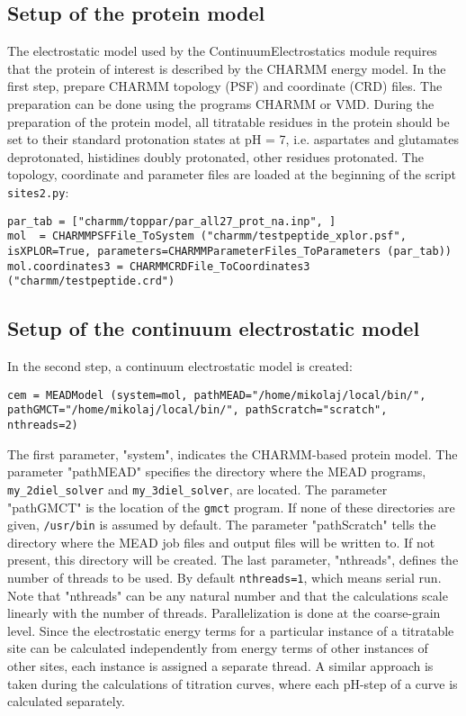 \documentclass[a4paper,11pt]{article}
\newcommand{\modulename}{ContinuumElectrostatics\xspace}
\begin{document}
{%
\subsection{Setup of the protein model}
The electrostatic model used by the \modulename module requires that the protein
of interest is described by the CHARMM energy model\cite{MacKerell1998}.
%
In the first step, prepare CHARMM topology (PSF) and coordinate (CRD) files.
%
The preparation can be done using the programs CHARMM\cite{CHARMM_Brooks1983}
or VMD\cite{VMD1996}.
%
During the preparation of the protein model, all titratable residues in the protein
should be set to their standard protonation states at pH = 7, i.e. aspartates
and glutamates deprotonated, histidines doubly protonated, other residues
protonated.
%
The topology, coordinate and parameter files are loaded at the
beginning of the script \texttt{sites2.py}:

{\footnotesize \begin{lstlisting}
par_tab = ["charmm/toppar/par_all27_prot_na.inp", ]
mol  = CHARMMPSFFile_ToSystem ("charmm/testpeptide_xplor.psf", isXPLOR=True, parameters=CHARMMParameterFiles_ToParameters (par_tab))
mol.coordinates3 = CHARMMCRDFile_ToCoordinates3 ("charmm/testpeptide.crd")
\end{lstlisting} }


\subsection{Setup of the continuum electrostatic model}
In the second step, a continuum electrostatic model is created:

{\footnotesize \begin{lstlisting}
cem = MEADModel (system=mol, pathMEAD="/home/mikolaj/local/bin/", pathGMCT="/home/mikolaj/local/bin/", pathScratch="scratch", nthreads=2)
\end{lstlisting} }

\bigskip
%
The first parameter, "system",
indicates the CHARMM-based protein model.
%
The parameter "pathMEAD" specifies the directory where the MEAD programs,
\texttt{my\_2diel\_solver} and \texttt{my\_3diel\_solver}, are located.
%
The parameter "pathGMCT" is the location of the \texttt{gmct} program.
%
If none of these directories are given, \texttt{/usr/bin} is assumed
by default.
%
The parameter "pathScratch" tells the directory where the MEAD job files
and output files will be written to.
%
If not present, this directory will be created.
%
The last parameter, "nthreads", defines the number of threads to be used.
%
By default \texttt{nthreads=1}, which means serial run.
%
Note that "nthreads" can be any natural number and that the calculations
scale linearly with the number of threads.
%
Parallelization is done at the coarse-grain level.
%
Since the electrostatic energy terms for a particular instance of a titratable
site can be calculated independently from energy terms of other instances of other
sites, each instance is assigned a separate thread.
%
A similar approach is taken during the calculations of titration curves,
where each pH-step of a curve is calculated separately.


}
\end{document}
